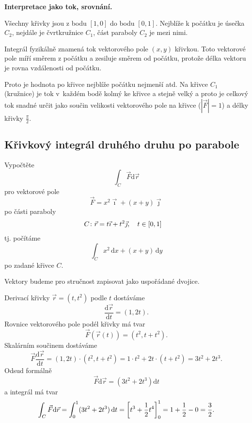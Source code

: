 
\textbf{Interpretace jako tok, srovnání.}

Všechny křivky jsou z bodu $[1,0]$ do bodu $[0,1]$. Nejblíže k počátku je úsečka $C_2$, nejdále je čvrtkružnice $C_1$, část paraboly $C_2$ je mezi nimi.

Integrál fyzikálně znamená tok vektorového pole $(x,y)$ křivkou. Toto vektorové pole míří směrem z počátku a zesiluje směrem od počátku, protože délka vektoru je rovna vzdálenosti od počátku.

Proto je hodnota po křivce nejblíže počátku nejmenší atd. Na křivce $C_1$ (kružnice) je tok v~každém bodě kolmý ke křivce a stejně velký a proto je celkový tok snadné určit jako součin velikosti vektorového pole na křivce ($|\vec F|=1$) a délky křivky $\frac \pi 2$.


\konec


\subsection{Křivkový integrál druhého druhu po parabole}


Vypočtěte $$\int_{C} \vec F \mathrm d\vec r$$ pro vektorové pole $$\vec F=x^2\vec \imath + (x+y)\vec\jmath$$ po části paraboly
\begin{align*}
  C&\colon \vec r=t\vec \imath + t^2\vec\jmath, \quad t\in\qty[0,1]
\end{align*}
tj. počítáme
$$\int_C x^2\,\mathrm dx + (x+y)\,\mathrm dy$$
po zadané křivce $C$.

\reseni

Vektory budeme pro stručnost zapisovat jako uspořádané dvojice.

\stranka

Derivací křivky $\vec r=(t,t^2)$ podle $t$ dostáváme
$$\frac{\mathrm d\vec r}{\mathrm dt}=(1,2t).$$
Rovnice vektorového pole podél křivky má tvar
$$\vec F(\vec r(t))=(t^2,t+t^2).$$
Skalárním součinem dostáváme
$$\vec F \frac{\mathrm d\vec r}{\mathrm dt}=
(1,2t)\cdot (t^2,t+t^2) = 1\cdot t^2+2t\cdot(t+t^2)=3t^2+2t^3.
$$
Odsud formálně $$\vec F\mathrm d\vec r=(3t^2+2t^3)\mathrm dt$$
a integrál má tvar
$$\int_C\vec F\mathrm d\vec r=\int_0^{1}(3t^2+2t^3)\,\mathrm dt
=\qty[t^3+\frac 12 t^4]_0^1=1+\frac 12 - 0 = \frac 32.$$

